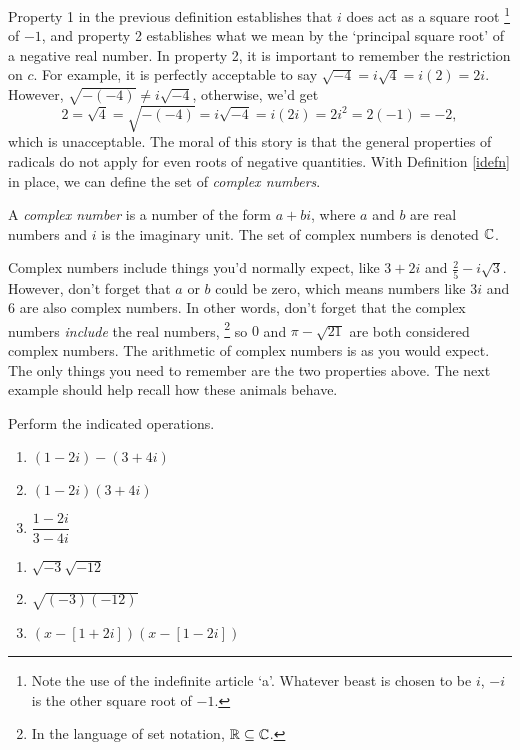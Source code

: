 \documentclass{ximera}
\begin{document}
Property 1 in the previous definition establishes that $i$ does act as a square root%
\footnote{Note the use of the indefinite article `a'.  Whatever beast is chosen to be $i$, $-i$ is the other square root of $-1$.} 
of $-1$, and property 2 establishes what we mean by the `principal square root' of a negative real number.  In property 2, it is important to remember the restriction on $c$.  For example, it is perfectly acceptable to say  $\sqrt{-4} = i \sqrt{4} = i(2) = 2i$. However, $\sqrt{-(-4)} \neq i \sqrt{-4}$, otherwise, we'd get\[ 2 = \sqrt{4} = \sqrt{-(-4)} = i \sqrt{-4} = i (2i) = 2i^2 = 2(-1) = -2,\] which is unacceptable. The moral of this story is that the general properties of radicals do not apply for even roots of negative quantities.  With Definition \ref{idefn} in place, we can define the set of \emph{complex numbers}.

A \emph{complex number} is a number of the form $a+bi$, where $a$ and $b$ are real numbers and $i$ is the imaginary unit.  The set of complex numbers is denoted $\mathbb{C}$.


Complex numbers include things you'd normally expect, like $3+2i$ and $\frac{2}{5} - i\sqrt{3}$.  However, don't forget that $a$ or $b$ could be zero, which means numbers like $3i$ and $6$ are also complex numbers.  In other words, don't forget that the complex numbers \textit{include} the real numbers,%
\footnote{In the language of set notation, $\mathbb{R} \subseteq \mathbb{C}$.} 
so $0$ and $\pi - \sqrt{21}$ are both considered complex numbers.   The arithmetic of complex numbers is as you would expect.  The only things you need to remember are the two properties above.  The next example should help recall how these animals behave.

\begin{example} 
    \label{complexzeroex1} Perform the indicated operations.
    \label{complexnumberarithmetic}
    \begin{multicols}{3}
        \begin{enumerate}
            \item  $(1-2i) - (3+4i)$ 
            \item  $(1-2i)(3+4i)$ 
            \item  $\dfrac{1-2i}{3-4i}$
        \end{enumerate}
    \end{multicols}
    \begin{multicols}{3}
        \begin{enumerate}
            \item  $\sqrt{-3} \sqrt{-12}$
            \item  $\sqrt{(-3)(-12)}$
            \item  $(x-[1+2i])(x-[1-2i])$
        \end{enumerate}
    \end{multicols}

\end{example}
\end{document}
